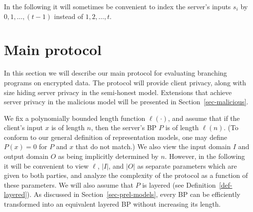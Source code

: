 \documentclass{article}
\newcommand{\bp}{\mbox{BP}\;}
\newcommand{\length}{{\sf length}}
\begin{document}
In the following it will sometimes be convenient to index the
server's inputs $s_i$ by $0,1,\ldots,(t-1)$ instead of
$1,2,\ldots,t$.


\section{Main protocol}
\label{sec-main}

In this section we will describe our main protocol for evaluating
branching programs on encrypted data.  The protocol will provide
client privacy, along with size hiding server privacy in the
semi-honest model. Extensions that achieve server privacy in the
malicious model will be presented in Section~\ref{sec-malicious}.

We fix a polynomially bounded length function $\ell(\cdot)$, and
assume that if the client's input $x$ is of length $n$, then the
server's BP $P$ is of length $\ell(n)$. (To conform to our general
definition of representation models, one may define $P(x)=0$ for $P$
and $x$ that do not match.) We also view the input domain $I$ and
output domain $O$ as being implicitly determined by $n$.  However,
in the following it will be convenient to view $\ell$, $|I|$, and
$|O|$ as  separate parameters which are given to both parties, and
analyze the complexity of the protocol as a function of these
parameters.  We will also assume that $P$ is layered (see
Definition~\ref{def-layered}). As discussed in
Section~\ref{sec-prel-models}, every BP can be efficiently transformed
into an equivalent layered BP without increasing its length.
\end{document}
